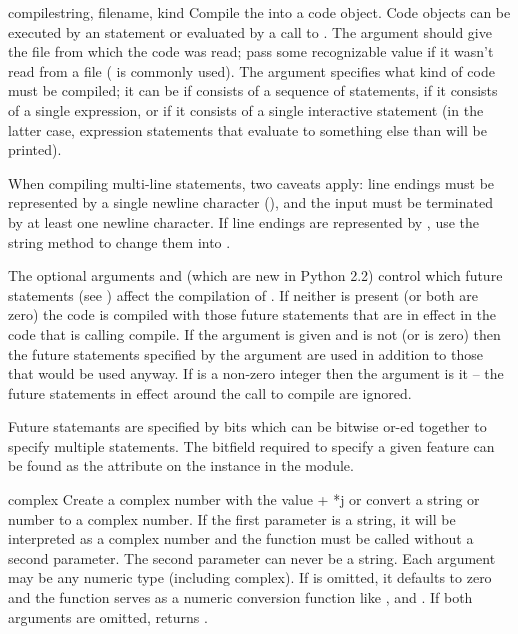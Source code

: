 \begin{funcdesc}{compile}{string, filename, kind}
  Compile the  into a code object.  Code objects can be
  executed by an  statement or evaluated by a call to
  .  The  argument should
  give the file from which the code was read; pass some recognizable value
  if it wasn't read from a file ( is commonly used).
  The  argument specifies what kind of code must be
  compiled; it can be  if  consists of a
  sequence of statements,  if it consists of a single
  expression, or  if it consists of a single
  interactive statement (in the latter case, expression statements
  that evaluate to something else than  will be printed).

  When compiling multi-line statements, two caveats apply: line
  endings must be represented by a single newline character
  (), and the input must be terminated by at least one
  newline character.  If line endings are represented by
  , use the string  method to
  change them into .

  The optional arguments  and 
  (which are new in Python 2.2) control which future statements (see
  ) affect the compilation of .  If neither is
  present (or both are zero) the code is compiled with those future
  statements that are in effect in the code that is calling compile.
  If the  argument is given and  is not
  (or is zero) then the future statements specified by the 
  argument are used in addition to those that would be used anyway.
  If  is a non-zero integer then the 
  argument is it -- the future statements in effect around the call to
  compile are ignored.

  Future statemants are specified by bits which can be bitwise or-ed
  together to specify multiple statements.  The bitfield required to
  specify a given feature can be found as the 
  attribute on the  instance in the
   module.
\end{funcdesc}

\begin{funcdesc}{complex}{}
  Create a complex number with the value  + *j or
  convert a string or number to a complex number.  If the first
  parameter is a string, it will be interpreted as a complex number
  and the function must be called without a second parameter.  The
  second parameter can never be a string.
  Each argument may be any numeric type (including complex).
  If  is omitted, it defaults to zero and the function
  serves as a numeric conversion function like ,
   and .  If both arguments
  are omitted, returns .
\end{funcdesc}


